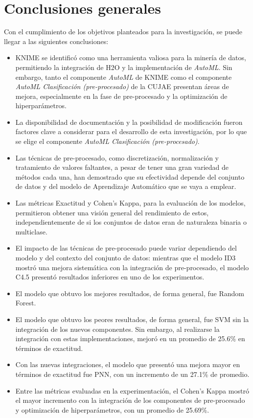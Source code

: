 \chapter*{Conclusiones generales}
Con el cumplimiento de los objetivos planteados para la investigación, se puede llegar a las siguientes conclusiones:
\begin{itemize}
	\item KNIME se identificó como una herramienta valiosa para la minería de datos, permitiendo la integración de H2O y la implementación de \textit{AutoML}. Sin embargo, tanto el componente \textit{AutoML} de KNIME como el componente \textit{AutoML Clasificación (pre-procesado)} de la CUJAE presentan áreas de mejora, especialmente en la fase de pre-procesado y la optimización de hiperparámetros.
	\item La disponibilidad de documentación y la posibilidad de modificación fueron factores clave a considerar para el desarrollo de esta investigación, por lo que se elige el componente \textit{AutoML Clasificación (pre-procesado)}.
	\item Las técnicas de pre-procesado, como discretización, normalización y tratamiento de valores faltantes, a pesar de tener una gran variedad de métodos cada una, han demostrado que su efectividad depende del conjunto de datos y del modelo de Aprendizaje Automático que se vaya a emplear.
	\item Las métricas Exactitud y Cohen's Kappa, para la evaluación de los modelos, permitieron obtener una visión general del rendimiento de estos, independientemente de si los conjuntos de datos eran de naturaleza binaria o multiclase.
	\item El impacto de las técnicas de pre-procesado puede variar dependiendo del modelo y del contexto del conjunto de datos: mientras que el modelo ID3 mostró una mejora sistemática con la integración de pre-procesado, el modelo C4.5 presentó resultados inferiores en uno de los experimentos.
	\item El modelo que obtuvo los mejores resultados, de forma general, fue Random Forest.
	\item El modelo que obtuvo los peores resultados, de forma general, fue SVM sin la integración de los nuevos componentes. Sin embargo, al realizarse la integración con estas implementaciones, mejoró en un promedio de 25.6\% en términos de exactitud.
	\item Con las nuevas integraciones, el modelo que presentó una mejora mayor en términos de exactitud fue PNN, con un incremento de un 27.1\% de promedio.
	\item Entre las métricas evaluadas en la experimentación, el Cohen’s Kappa mostró el mayor incremento con la integración de los componentes de pre-procesado y optimización de hiperparámetros, con un promedio de 25.69\%.
\end{itemize}